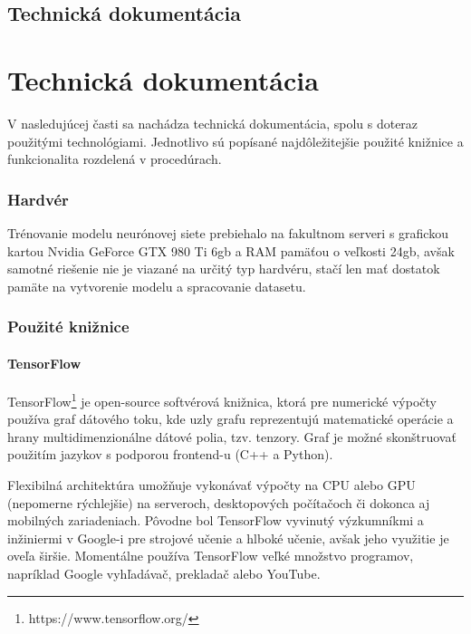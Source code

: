\newpage
\pagestyle{plain}
{
	\section{Technická dokumentácia}
}
{
	\chapter{Technická dokumentácia}
}
 \label{technical_documentation}
 
V nasledujúcej časti sa nachádza technická dokumentácia, spolu s doteraz použitými technológiami. Jednotlivo sú popísané najdôležitejšie použité knižnice a funkcionalita rozdelená v procedúrach.  

\subsection{Hardvér}
Trénovanie modelu neurónovej siete prebiehalo na fakultnom serveri s grafickou kartou Nvidia GeForce GTX 980 Ti 6gb a RAM pamäťou o veľkosti 24gb, avšak samotné riešenie nie je viazané na určitý typ hardvéru, stačí len mať dostatok pamäte na vytvorenie modelu a spracovanie datasetu. 

\subsection{Použité knižnice}

\subsubsection{TensorFlow}

TensorFlow\footnote{https://www.tensorflow.org/} je open-source softvérová knižnica, ktorá pre numerické výpočty používa graf dátového toku, kde uzly grafu reprezentujú matematické operácie a hrany multidimenzionálne dátové polia, tzv. tenzory. Graf je možné skonštruovať použitím jazykov s podporou frontend-u (C++ a Python). 

Flexibilná architektúra umožňuje vykonávať výpočty na CPU alebo GPU (nepomerne rýchlejšie) na serveroch, desktopových počítačoch či dokonca aj mobilných zariadeniach. Pôvodne bol TensorFlow vyvinutý výzkumníkmi a inžiniermi v Google-i pre strojové učenie a hlboké učenie, avšak jeho využitie je oveľa širšie. Momentálne používa TensorFlow veľké množstvo programov, napríklad Google vyhľadávač, prekladač alebo YouTube. 

